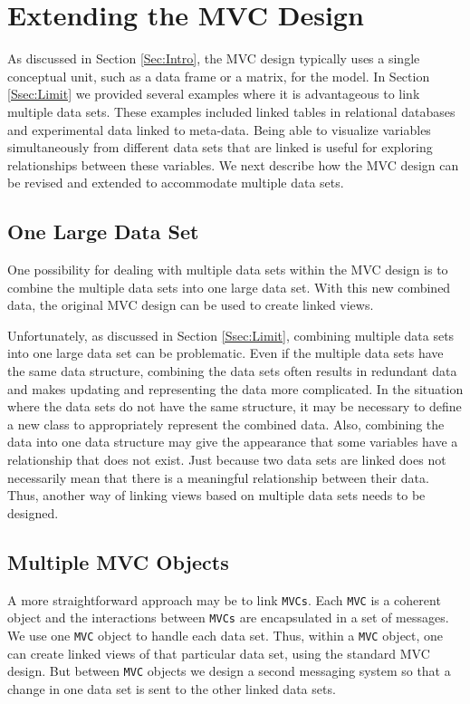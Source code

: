\documentclass{article}[11pt]
\newcommand{\Robject}[1]{{\texttt{#1}}}
\begin{document}
\section{Extending the MVC Design}\label{Sec:Extend}

As discussed in Section \ref{Sec:Intro}, the MVC design typically uses a single
conceptual unit, such as a data frame or a matrix, for the model.  In Section
\ref{Ssec:Limit} we provided several examples where it is advantageous to link
multiple data sets.  These examples included linked tables in relational
databases and experimental data linked to meta-data.  Being able to visualize
variables simultaneously from different data sets that are linked is useful for
exploring relationships between these variables.  We next describe how the MVC
design can be revised and extended to accommodate multiple data sets. 

\subsection{One Large Data Set}\label{Ssec:OneDS}

One possibility for dealing with multiple data sets within the MVC design is to
combine the multiple data sets into one large data set.  With this new
combined data, the original MVC design can be used to create linked views.

Unfortunately, as discussed in Section \ref{Ssec:Limit}, combining
multiple data sets into one large data set can be problematic.  Even if the
multiple data sets have the same data structure, combining the data sets often
results in redundant data and makes updating and representing the
data more complicated.  In the situation where the data sets do not have the
same structure, it may be necessary to define a new class to appropriately
represent the combined data.  Also, combining the data into one data structure
may give the appearance that some variables have a relationship that does not
exist.  Just because two data sets are linked does not necessarily mean that
there is a meaningful relationship between their data.  Thus, another way
of linking views based on multiple data sets needs to be designed. 

\subsection{Multiple MVC Objects}\label{Ssec:MMVC}

A more straightforward approach may be to link \Robject{MVCs}.  Each
\Robject{MVC} is a coherent object and the interactions between \Robject{MVCs}
are encapsulated in a set of messages.  We use one \Robject{MVC} object to
handle each data set.  Thus, within a \Robject{MVC} object, one can create
linked views of that particular data set, using the standard MVC design.  But
between \Robject{MVC} objects we design a second messaging system so that a
change in one data set is sent to the other linked data sets. 
\end{document}
